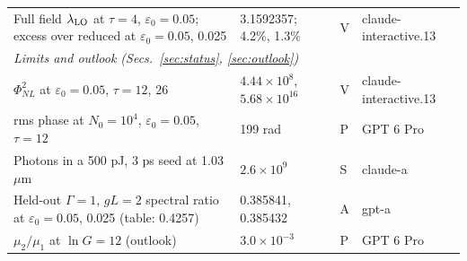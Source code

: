 \documentclass[aps,pra,twocolumn,superscriptaddress,nofootinbib,floatfix]{revtex4-2}
\newcommand{\PNL}{\Phi_{NL}}
\newcommand{\eps}{\varepsilon_0}
\newcommand{\lamLO}{\lambda_{\rm LO}}
\begin{document}
\begin{table}[t]
\begin{ruledtabular}
\begin{tabular}{p{9.0cm}p{4.6cm}p{0.7cm}p{2.7cm}}
\raggedright Full field $\lamLO$ at $\tau=4$, $\eps=0.05$; excess over reduced at $\eps=0.05$, 0.025 & \raggedright 3.1592357; 4.2\%, 1.3\% & \raggedright V & \raggedright claude-interactive.13 \tabularnewline
\multicolumn{4}{l}{\textit{Limits and outlook (Secs.~\ref{sec:status}, \ref{sec:outlook})}} \tabularnewline
\raggedright $\PNL^2$ at $\eps=0.05$, $\tau=12$, 26 & \raggedright $4.44\times10^8$, $5.68\times10^{16}$ & \raggedright V & \raggedright claude-interactive.13 \tabularnewline
\raggedright rms phase at $N_0=10^4$, $\eps=0.05$, $\tau=12$ & \raggedright 199 rad & \raggedright P & \raggedright GPT 6 Pro \tabularnewline
\raggedright Photons in a 500 pJ, 3 ps seed at 1.03 $\mu$m & \raggedright $2.6\times10^9$ & \raggedright S & \raggedright claude-a \tabularnewline
\raggedright Held-out $\Gamma=1$, $gL=2$ spectral ratio at $\eps=0.05$, 0.025 (table: 0.4257) & \raggedright 0.385841, 0.385432 & \raggedright A & \raggedright gpt-a \tabularnewline
\raggedright $\mu_2/\mu_1$ at $\ln G=12$ (outlook) & \raggedright $3.0\times10^{-3}$ & \raggedright P & \raggedright GPT 6 Pro \tabularnewline
\end{tabular}
\end{ruledtabular}
\end{table}

\clearpage

\end{document}
